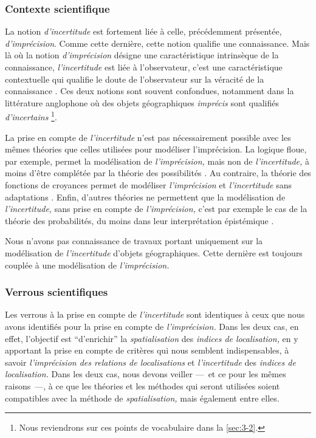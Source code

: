 \subsubsection{Contexte scientifique}

La notion \emph{d'incertitude} est fortement liée à celle,
précédemment présentée, \emph{d'imprécision}. Comme cette dernière,
cette notion qualifie une connaissance. Mais là où la notion
\emph{d'imprécision} désigne une caractéristique intrinsèque de la
connaissance, \emph{l'incertitude} est liée à l'observateur, c'est une
caractéristique contextuelle qui qualifie le doute de l'observateur
sur la véracité de la connaissance
\autocite{Bouchon-Meunier1995,Bouchon-Meunier2007}. Ces deux notions
sont souvent confondues, notamment dans la littérature anglophone où
des objets géographiques \emph{imprécis} sont qualifiés
\emph{d'incertains} \footnote{Nous reviendrons sur ces points de
  vocabulaire dans la \autoref{sec:3-2}.}.

La prise en compte de \emph{l'incertitude} n'est pas nécessairement
possible avec les mêmes théories que celles utilisées pour modéliser
l'imprécision. La logique floue, par exemple, permet la modélisation
de \emph{l'imprécision,} mais non de \emph{l'incertitude,} à moins
d'être complétée par la théorie des possibilités
\autocite{Bouchon-Meunier1995,Bouchon-Meunier2007}. Au contraire, la
théorie des fonctions de croyances permet de modéliser
\emph{l'imprécision} et \emph{l'incertitude} sans adaptations
\autocite{Bouchon-Meunier1995,Bouchon-Meunier2007}. Enfin, d'autres
théories ne permettent que la modélisation de \emph{l'incertitude,}
sans prise en compte de \emph{l'imprécision,} c'est par exemple le cas
de la théorie des probabilités, du moins dans leur interprétation
épistémique \autocite{Hajek2019}.

Nous n'avons pas connaissance de travaux portant uniquement sur la
modélisation de \emph{l'incertitude} d'objets géographiques. Cette
dernière est toujours couplée à une modélisation de
\emph{l'imprécision.}

\subsubsection{Verrous scientifiques}

Les verrous à la prise en compte de \emph{l'incertitude} sont
identiques à ceux que nous avons identifiés pour la prise en compte de
\emph{l'imprécision.} Dans les deux cas, en effet, l'objectif est
\enquote{d'enrichir} la \emph{spatialisation} des \emph{indices de
  localisation,} en y apportant la prise en compte de critères qui
nous semblent indispensables, à savoir \emph{l'imprécision des
  relations de localisations} et \emph{l'incertitude} des
\emph{indices de localisation.} Dans les deux cas, nous devons veiller
---~et ce pour les mêmes raisons~---, à ce que les théories et les
méthodes qui seront utilisées soient compatibles avec la méthode de
\emph{spatialisation,} mais également entre elles.

